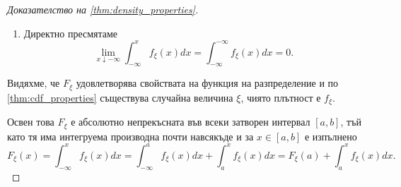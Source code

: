 \documentclass{../../common/topic}
\begin{document}
\begin{proof}[Доказателство на \cref{thm:density_properties}]
\begin{enumerate}
    \item Директно пресмятаме
    \begin{equation*}
      \lim_{x \downarrow -\infty} \int_{-\infty}^x f_\xi(x) dx
      =
      \int_{-\infty}^{-\infty} f_\xi(x) dx
      =
      0.
    \end{equation*}
  \end{enumerate}

  Видяхме, че \( F_\xi \) удовлетворява свойствата на функция на разпределение и по \cref{thm:cdf_properties} съществува случайна величина \( \xi \), чиято плътност е \( f_\xi \).

  Освен това \( F_\xi \) е абсолютно непрекъсната във всеки затворен интервал \( [a, b] \), тъй като тя има интегруема производна почти навсякъде и за \( x \in [a, b] \) е изпълнено
  \begin{equation*}
    F_\xi(x)
    =
    \int_{-\infty}^x f_\xi(x) dx
    =
    \int_{-\infty}^a f_\xi(x) dx + \int_a^x f_\xi(x) dx
    =
    F_\xi(a) + \int_a^x f_\xi(x) dx.
  \end{equation*}
\end{proof}
\end{document}
